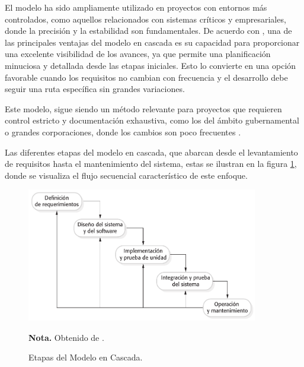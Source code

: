 		El modelo ha sido ampliamente utilizado en proyectos con entornos más controlados, como aquellos relacionados con sistemas críticos y empresariales, donde la precisión y la estabilidad son fundamentales. De acuerdo con \textcite{pressman2010ingenieria}, una de las principales ventajas del modelo en cascada es su capacidad para proporcionar una excelente visibilidad de los avances, ya que permite una planificación minuciosa y detallada desde las etapas iniciales. Esto lo convierte en una opción favorable cuando los requisitos no cambian con frecuencia y el desarrollo debe seguir una ruta específica sin grandes variaciones.
		
		Este modelo, sigue siendo un método relevante para proyectos que requieren control estricto y documentación exhaustiva, como los del ámbito gubernamental o grandes corporaciones, donde los cambios son poco frecuentes \parencite{sommerville2011introduccion}.
		
		Las diferentes etapas del modelo en cascada, que abarcan desde el levantamiento de requisitos hasta el mantenimiento del sistema, estas se ilustran en la figura \ref{fig:figura2_1}, donde se visualiza el flujo secuencial característico de este enfoque.
		
		\vspace{0.3cm} %
		
		\begin{figure}[h] %
			\caption[Etapas del Modelo en Cascada]
			{\newline Etapas del Modelo en Cascada.} %
			\centering
			\includegraphics[width=0.9\textwidth]{imagenes/figura2_1.png} %
			
			\begin{flushleft}
				\hspace{1.20cm} \textbf{Nota.} Obtenido de \textcite{sommerville2011introduccion}. %
			\end{flushleft}
			\vspace{-16pt}
			\label{fig:figura2_1} %
		\end{figure}
		
